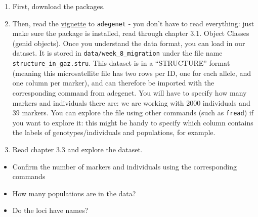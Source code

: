 \documentclass[
  letterpaper,
  DIV=11,
  numbers=noendperiod]{scrreprt}
\providecommand{\tightlist}{%
  \setlength{\itemsep}{0pt}\setlength{\parskip}{0pt}}\usepackage{longtable,booktabs,array}
\begin{document}
\begin{enumerate}
\def\labelenumi{\arabic{enumi}.}
\item
  First, download the packages.
\item
  Then, read the
  \href{https://adegenet.r-forge.r-project.org/files/tutorial-basics.pdf}{vignette}
  to \texttt{adegenet} - you don't have to read everything: just make
  sure the package is installed, read through chapter 3.1. Object
  Classes (genid objects). Once you understand the data format, you can
  load in our dataset. It is stored in \texttt{data/week\_8\_migration}
  under the file name \texttt{structure\_in\_gaz.stru}. This dataset is
  in a ``STRUCTURE'' format (meaning this microsatellite file has two
  rows per ID, one for each allele, and one column per marker), and can
  therefore be imported with the corresponding command from adegenet.
  You will have to specify how many markers and individuals there are:
  we are working with 2000 individuals and 39 markers. You can explore
  the file using other commands (such as \texttt{fread}) if you want to
  explore it: this might be handy to specify which column contains the
  labels of genotypes/individuals and populations, for example.
\item
  Read chapter 3.3 and explore the dataset.
\end{enumerate}

\begin{itemize}
\tightlist
\item
  Confirm the number of markers and individuals using the corresponding
  commands
\item
  How many populations are in the data?
\item
  Do the loci have names?
\end{itemize}
\end{document}
